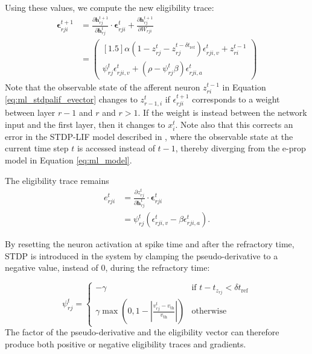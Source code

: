 	        Using these values, we compute the new eligibility trace:
	        \begin{align}
	        \mathbf{\epsilon}^{t+1}_{rji} &= \frac{\partial\mathbf{h}^{t+1}_{rj}}{\partial\mathbf{h}^t_{rj}}\cdot\mathbf{\epsilon}^t_{rji} + \frac{\partial\mathbf{h}^{t+1}_{rj}}{\partial W_{rji}}\\
	        &= \begin{pmatrix}[1.5]
	        \alpha\left(1 - z^t_{rj} - z_{rj}^{t-\delta t_\text{ref}}\right)\epsilon_{rji, v}^t + z_{ri}^{t-1}\\
	        \psi^t_{rj}\epsilon^t_{rji, v} + \left(\rho - \psi^t_{rj}\beta\right)\epsilon^t_{rji,a}
	        \end{pmatrix}\label{eq:ml_stdpalif_evector}
	        \end{align}
	        Note that the observable state of the afferent neuron $z_{ri}^{t-1}$ in Equation \ref{eq:ml_stdpalif_evector} changes to $z_{r-1, i}^t$ if $\epsilon^{t+1}_{rji}$ corresponds to a weight between layer $r-1$ and $r$ and $r > 1$.
	        If the weight is instead between the network input and the first layer, then it changes to $x^t_i$.
	        Note also that this corrects an error in the STDP-LIF model described in \cite{traub2020learning}, where the observable state at the current time step $t$ is accessed instead of $t-1$, thereby diverging from the e-prop model in Equation \ref{eq:ml_model}.

	        The eligibility trace remains 
	        \begin{align}
	        e^{t}_{rji} &= \frac{\partial z^{t}_{rj}}{\partial\mathbf{h}^{t}_{rj}} \cdot \mathbf{\epsilon}^{t}_{rji}\\
	        &= \psi^t_{rj}\left(\epsilon^t_{rji, v} - \beta\epsilon^t_{rji, a}\right).
	        \end{align}

	        By resetting the neuron activation at spike time and after the refractory time, STDP is introduced in the system by clamping the pseudo-derivative to a negative value, instead of 0, during the refractory time:

	        \begin{equation}
	        \psi^t_{rj} = \begin{cases}
	        -\gamma&\mbox{if } t - t_{z_{rj}} < \delta t_\text{ref}\\
	        \gamma\max\left(0, 1 - \left|\frac{v^t_{rj}-v_\text{th}}{v_\text{th}}\right|\right)&\mbox{otherwise}
	        \end{cases}
	        \end{equation}
	        The factor of the pseudo-derivative and the eligibility vector can therefore produce both positive or negative eligibility traces and gradients.

